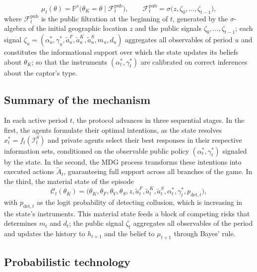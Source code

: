 \documentclass[review,authoryear,12pt]{elsarticle}
\theoremstyle{plain}
\theoremstyle{definition}
\newcommand{\Prob}{\mathbb{P}}
\newcommand{\1}{\mathbf{1}}
\begin{document}
\[
\mu_t(\theta)=\Prob^s\!\bigl(\theta_K=\theta\mid\mathcal{F}_t^{\mathrm{pub}}\bigr),\qquad \mathcal{F}_t^{\mathrm{pub}}=\sigma\bigl(z,\zeta_0,\ldots,\zeta_{t-1}\bigr),
\]
where $\mathcal{F}_t^{\mathrm{pub}}$ is the public filtration at the beginning of $t$, generated by the $\sigma$-algebra of the initial geographic location $z$ and the public signals $\zeta_0,\ldots,\zeta_{t-1}$; each signal $\zeta_u=(\alpha_u^\ast,\gamma_u^\ast,\tilde{a}_u^F,\tilde{a}_u^K,\tilde{a}_u^S,m_u,d_u)$ aggregates all observables of period $u$ and constitutes the informational support over which the state updates its beliefs about $\theta_K$; so that the instruments $(\alpha_t^\ast,\gamma_t^\ast)$ are calibrated on correct inferences about the captor's type.

\subsection{Summary of the mechanism}\label{subsec:resumen-mecanismo}

In each active period $t$, the protocol advances in three sequential stages. In the first, the agents formulate their optimal intentions, as the state resolves $x_t^\ast=f_t(\mathcal{I}_t^S)$ and private agents select their best responses in their respective information sets, conditioned on the observable public policy $(\alpha_t^\ast,\gamma_t^\ast)$ signaled by the state. In the second, the MDG process transforms these intentions into executed actions $\tilde{A}_t$, guaranteeing full support across all branches of the game. In the third, the material state of the episode
\[
\mathcal{C}_t(\theta_K)=\bigl(\theta_K,\theta_F,\theta_V,\theta_S,z,\tilde{a}_t^F,\tilde{a}_t^K,\tilde{a}_t^S,\alpha_t^\ast,\gamma_t^\ast,p_{\mathrm{det},t}\bigr),
\]
with $p_{\mathrm{det},t}$ as the logit probability of detecting collusion, which is increasing in the state's instruments. This material state feeds a block of competing risks that determines $m_t$ and $d_t$; the public signal $\zeta_t$ aggregates all observables of the period and updates the history to $h_{t+1}$ and the belief to $\mu_{t+1}$ through Bayes' rule.

\subsection{Probabilistic technology}\label{subsec:prob-tech}
\end{document}
